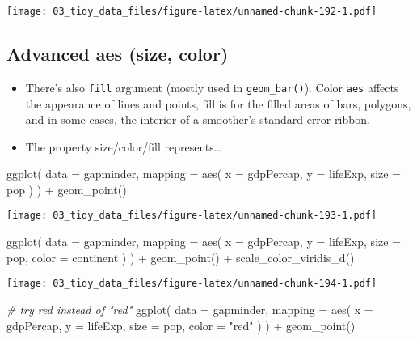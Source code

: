 \documentclass[
]{book}
\newenvironment{Shaded}{\begin{snugshade}}{\end{snugshade}}
\newcommand{\AttributeTok}[1]{\textcolor[rgb]{0.77,0.63,0.00}{#1}}
\newcommand{\CommentTok}[1]{\textcolor[rgb]{0.56,0.35,0.01}{\textit{#1}}}
\newcommand{\FunctionTok}[1]{\textcolor[rgb]{0.00,0.00,0.00}{#1}}
\newcommand{\NormalTok}[1]{#1}
\newcommand{\SpecialCharTok}[1]{\textcolor[rgb]{0.00,0.00,0.00}{#1}}
\newcommand{\StringTok}[1]{\textcolor[rgb]{0.31,0.60,0.02}{#1}}
\begin{document}
\texttt{[image: 03\_tidy\_data\_files/figure-latex/unnamed-chunk-192-1.pdf]}

\hypertarget{advanced-aes-size-color}{%
\subsection{Advanced aes (size, color)}\label{advanced-aes-size-color}}

\begin{itemize}
\item
  There's also \texttt{fill} argument (mostly used in \texttt{geom\_bar()}). Color \texttt{aes} affects the appearance of lines and points, fill is for the filled areas of bars, polygons, and in some cases, the interior of a smoother's standard error ribbon.
\item
  The property size/color/fill represents\ldots{}
\end{itemize}

\begin{Shaded}
\begin{Highlighting}[]
\FunctionTok{ggplot}\NormalTok{(}
  \AttributeTok{data =}\NormalTok{ gapminder,}
  \AttributeTok{mapping =} \FunctionTok{aes}\NormalTok{(}
    \AttributeTok{x =}\NormalTok{ gdpPercap, }\AttributeTok{y =}\NormalTok{ lifeExp,}
    \AttributeTok{size =}\NormalTok{ pop}
\NormalTok{  )}
\NormalTok{) }\SpecialCharTok{+}
  \FunctionTok{geom\_point}\NormalTok{()}
\end{Highlighting}
\end{Shaded}

\texttt{[image: 03\_tidy\_data\_files/figure-latex/unnamed-chunk-193-1.pdf]}

\begin{Shaded}
\begin{Highlighting}[]
\FunctionTok{ggplot}\NormalTok{(}
  \AttributeTok{data =}\NormalTok{ gapminder,}
  \AttributeTok{mapping =} \FunctionTok{aes}\NormalTok{(}
    \AttributeTok{x =}\NormalTok{ gdpPercap, }\AttributeTok{y =}\NormalTok{ lifeExp,}
    \AttributeTok{size =}\NormalTok{ pop,}
    \AttributeTok{color =}\NormalTok{ continent}
\NormalTok{  )}
\NormalTok{) }\SpecialCharTok{+}
  \FunctionTok{geom\_point}\NormalTok{() }\SpecialCharTok{+}
  \FunctionTok{scale\_color\_viridis\_d}\NormalTok{()}
\end{Highlighting}
\end{Shaded}

\texttt{[image: 03\_tidy\_data\_files/figure-latex/unnamed-chunk-194-1.pdf]}

\begin{Shaded}
\begin{Highlighting}[]
\CommentTok{\# try red instead of "red"}
\FunctionTok{ggplot}\NormalTok{(}
  \AttributeTok{data =}\NormalTok{ gapminder,}
  \AttributeTok{mapping =} \FunctionTok{aes}\NormalTok{(}
    \AttributeTok{x =}\NormalTok{ gdpPercap, }\AttributeTok{y =}\NormalTok{ lifeExp,}
    \AttributeTok{size =}\NormalTok{ pop,}
    \AttributeTok{color =} \StringTok{"red"}
\NormalTok{  )}
\NormalTok{) }\SpecialCharTok{+}
  \FunctionTok{geom\_point}\NormalTok{()}
\end{Highlighting}
\end{Shaded}
\end{document}
